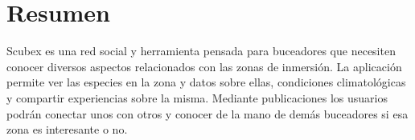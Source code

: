 \chapter*{Resumen}
Scubex es una red social y herramienta pensada para buceadores que necesiten 
conocer diversos aspectos relacionados con las zonas de inmersión. La aplicación
permite ver las especies en la zona y datos sobre ellas, condiciones climatológicas y 
compartir experiencias sobre la misma. Mediante publicaciones los usuarios podrán conectar
unos con otros y conocer de la mano de demás buceadores si esa zona es interesante o no.